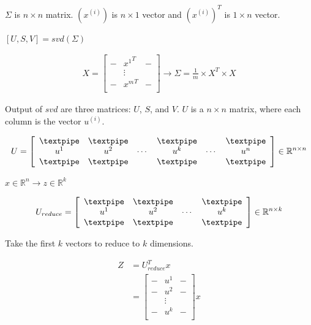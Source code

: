 \(\Sigma\) is \(n \times n\) matrix. \((x^{(i)})\) is \(n \times 1\)
vector and \((x^{(i)})^T\) is \(1 \times n\) vector.

\([U,S,V] = svd(\Sigma)\)

\begin{align*}
X =
\left[
\begin{array}{ccc}
- & {x^1}^T & -\\
  & \vdots &   \\
- & {x^m}^T & - \\
\end{array}
\right]
\rightarrow \Sigma = \frac{1}{m} \times X^T \times X
\end{align*}

Output of \(svd\) are three matrices: \(U\), \(S\), and \(V\). \(U\) is
a \(n \times n\) matrix, where each column is the vector \(u^{(i)}\).

\begin{align*}
U = \left[
\begin{array}{cccccc}
\textpipe & \textpipe &        & \textpipe &        & \textpipe\\
u^1       &       u^2 & \cdots & u^k       & \cdots & u^n\\
\textpipe & \textpipe &        & \textpipe &        & \textpipe
\end{array}
\right]
\in \mathbb{R}^{n \times n}
\end{align*}

\(x\in\mathbb{R}^n\rightarrow z\in\mathbb{R}^k\)

\begin{align*}
U_{reduce} = \left[
\begin{array}{cccc}
\textpipe & \textpipe & & \textpipe\\
u^1 & u^2 & \cdots & u^k\\
\textpipe & \textpipe & & \textpipe
\end{array}
\right]
\in \mathbb{R}^{n \times k}
\end{align*}

Take the first \(k\) vectors to reduce to \(k\) dimensions.

\begin{align*}
Z &= U_{reduce}^T x\\
  &= \left[
\begin{array}{cccc}
- & u^1 & -\\
- & u^2 & -\\
  & \vdots &   \\
- & u^k & - \\
\end{array}
\right]
x
\end{align*}

